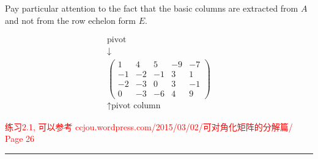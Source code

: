 Pay particular attention to the fact that the basic columns are extracted from \( A \) and not from the row echelon form \( E \).

\[
\begin{array}{c}
\text{pivot} \\
\downarrow \\
\begin{pmatrix}
1 & 4 & 5 & -9 & -7 \\
-1 & -2 & -1 & 3 & 1 \\
-2 & -3 & 0 & 3 & -1 \\
0 & -3 & -6 & 4 & 9
\end{pmatrix}\\
\uparrow \text{pivot column}
\end{array}
\]

\textcolor{red}{练习2.1, 可以参考 ccjou.wordpress.com/2015/03/02/可对角化矩阵的分解篇/ Page 26}
\color{red}\rule{\textwidth}{0.4pt}\color{black}

